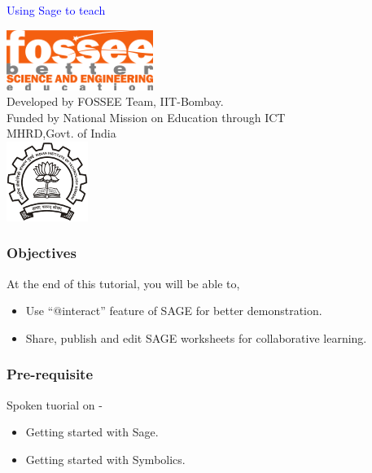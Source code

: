 \documentclass[presentation]{beamer}
\title{}
\author{FOSSEE}
\date{}
\begin{document}
\begin{frame}

\begin{center}
\vspace{12pt}
\textcolor{blue}{\huge Using Sage to teach}
\end{center}
\vspace{18pt}
\begin{center}
\vspace{10pt}
\includegraphics[scale=0.95]{../images/fossee-logo.png}\\
\vspace{5pt}
\scriptsize Developed by FOSSEE Team, IIT-Bombay. \\ 
\scriptsize Funded by National Mission on Education through ICT\\
\scriptsize  MHRD,Govt. of India\\
\includegraphics[scale=0.30]{../images/iitb-logo.png}\\
\end{center}
\end{frame}
\begin{frame}
\frametitle{Objectives}
\label{sec-2}

 At the end of this tutorial, you will be able to,


\begin{itemize}
\item Use ``@interact'' feature of SAGE for better demonstration.
\item Share, publish and edit SAGE worksheets for collaborative learning.
\end{itemize}
\end{frame}
\begin{frame}
\frametitle{Pre-requisite}
\label{sec-3}

  Spoken tuorial on -

\begin{itemize}
\item Getting started with Sage.
\item Getting started with Symbolics.
\end{itemize}
\end{frame}
\end{document}

